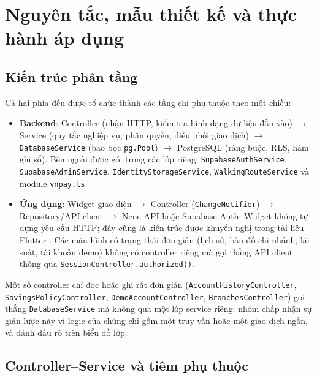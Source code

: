 \section{Nguyên tắc, mẫu thiết kế và thực hành áp dụng}
\label{sec:ch2-principles}

\subsection{Kiến trúc phân tầng}
\label{sec:ch2-layers}

Cả hai phía đều được tổ chức thành các tầng chỉ phụ thuộc theo một chiều:
\begin{itemize}
  \item \textbf{Backend}: Controller (nhận HTTP, kiểm tra hình dạng dữ liệu đầu vào) $\rightarrow$ Service (quy tắc nghiệp vụ, phân quyền, điều phối giao dịch) $\rightarrow$ \texttt{Database\allowbreak{}Service} (bao bọc \texttt{pg.\allowbreak{}Pool}) $\rightarrow$ PostgreSQL (ràng buộc, RLS, hàm ghi sổ). Bên ngoài được gói trong các lớp riêng: \texttt{Supabase\allowbreak{}Auth\allowbreak{}Service}, \texttt{Supabase\allowbreak{}Admin\allowbreak{}Service}, \texttt{Identity\allowbreak{}Storage\allowbreak{}Service}, \texttt{Walking\allowbreak{}Route\allowbreak{}Service} và module \texttt{vnpay.\allowbreak{}ts}.
  \item \textbf{Ứng dụng}: Widget giao diện $\rightarrow$ Controller (\texttt{Change\allowbreak{}Notifier}) $\rightarrow$ Repository/API client $\rightarrow$ Nene API hoặc Supabase Auth. Widget không tự dựng yêu cầu HTTP; đây cũng là kiến trúc được khuyến nghị trong tài liệu Flutter \parencite{ch2-flutter-architecture}. Các màn hình có trạng thái đơn giản (lịch sử, bản đồ chi nhánh, lãi suất, tài khoản demo) không có controller riêng mà gọi thẳng API client thông qua \texttt{Session\allowbreak{}Controller.\allowbreak{}authorized()}.
\end{itemize}
Một số controller chỉ đọc hoặc ghi rất đơn giản (\texttt{Account\allowbreak{}History\allowbreak{}Controller}, \texttt{Savings\allowbreak{}Policy\allowbreak{}Controller}, \texttt{Demo\allowbreak{}Account\allowbreak{}Controller}, \texttt{Branches\allowbreak{}Controller}) gọi thẳng \texttt{Database\allowbreak{}Service} mà không qua một lớp service riêng; nhóm chấp nhận sự giản lược này vì logic của chúng chỉ gồm một truy vấn hoặc một giao dịch ngắn, và đánh dấu rõ trên biểu đồ lớp.

\subsection{Controller--Service và tiêm phụ thuộc}
\label{sec:ch2-di}

